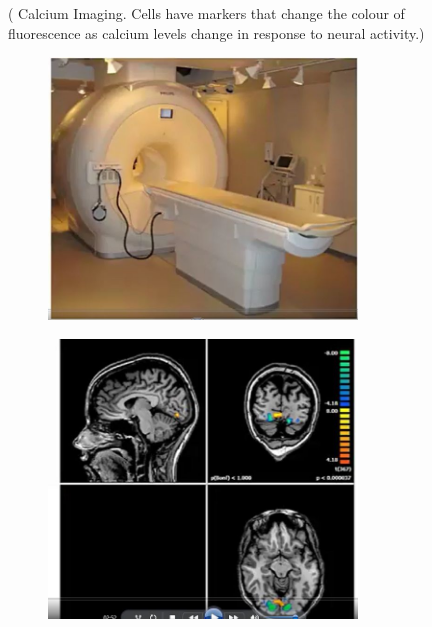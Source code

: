 \documentclass[]{article}
\begin{document}
\begin{figure}[H]
	\caption[Recording from the Brain]{Recording from the Brain. () \& () \gls{gls:fMRI}: resolution $1\;mm^3$; response is averaged over many neurons, and is slow. () \gls{gls:EEG}: response is averaged over many neurons; EEG is faster than fMRI, but noisy. () \& () Electrode Arrays: good if we have access to tissue directly} \label{fig:recording} ( Calcium Imaging. Cells have markers that change the colour of fluorescence as calcium levels change in response to neural activity.)
	\begin{subfigure}[b]{0.3\textwidth}
		\caption{}\label{fig:rb1}
		\includegraphics[width=0.9\textwidth]{fMRI}
	\end{subfigure}
	\begin{subfigure}[b]{0.3\textwidth}
		\caption{}\label{fig:rb2}
		\includegraphics[width=0.9\textwidth]{fMRI2}

\end{subfigure}
\end{figure}
\end{document}
